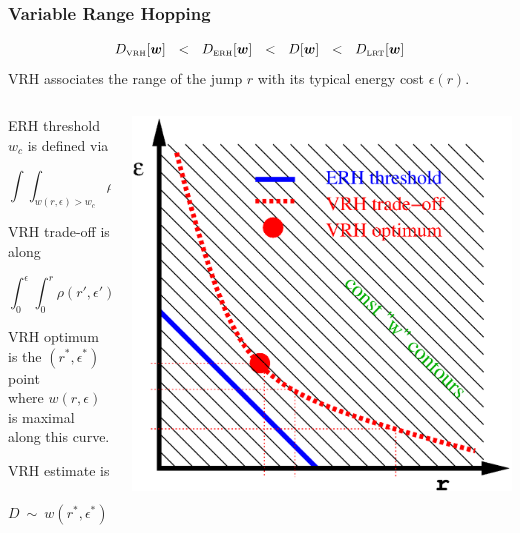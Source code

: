 \documentclass{beamer}
\newcommand{\tbox}[1]{\mbox{\tiny #1}}
\begin{document}
\begin{frame}
\frametitle{Variable Range Hopping}

%
\[
D_{\tbox{VRH}}[\bm{w}]  
\ \ < \ \ D_{\tbox{ERH}}[\bm{w}]
\ \ < \ \ D[\bm{w}]
\ \ < \ \ D_{\tbox{LRT}}[\bm{w}]
\]
%
VRH associates the range of the jump $r$ with its typical 
energy cost $\epsilon(r)$. 
%

\begin{columns}
\begin{column}{0.6\textwidth}
ERH threshold $w_c$ is defined via 

\[
\int\!\!\int_{w(r,\epsilon)>w_c} \rho(r,\epsilon)drd\epsilon \ \ = \ \ n_c
\]




VRH trade-off is along 

\[
\int_0^{\epsilon} \int_0^{r} \rho(r',\epsilon')  dr'd\epsilon' \ \ = \ \ n_c 
\]




VRH optimum is the $(r^*,\epsilon^*)$ point \\
where $w(r,\epsilon)$ is maximal along this curve. 



{VRH estimate} is \ \ $D \ \sim \ w(r^*,\epsilon^*) \times (r^*)^2$

\end{column}
\begin{column}{0.4\textwidth}
\includegraphics[width=1\hsize]{wdiagrm}
\end{column}
\end{columns}
\end{frame}
\end{document}
